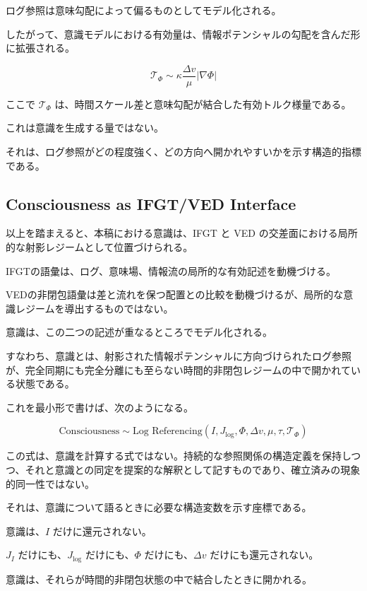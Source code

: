 ログ参照は意味勾配によって偏るものとしてモデル化される。

したがって、意識モデルにおける有効量は、情報ポテンシャルの勾配を含んだ形に拡張される。

\begin{equation}
\mathcal{T}_{\Phi}
\sim
\kappa
\frac{\Delta v}{\mu}
|\nabla \Phi|
\end{equation}

ここで $\mathcal{T}_{\Phi}$ は、時間スケール差と意味勾配が結合した有効トルク様量である。

これは意識を生成する量ではない。

それは、ログ参照がどの程度強く、どの方向へ開かれやすいかを示す構造的指標である。

\subsection{Consciousness as IFGT/VED Interface}

以上を踏まえると、本稿における意識は、IFGT と VED の交差面における局所的な射影レジームとして位置づけられる。

IFGTの語彙は、ログ、意味場、情報流の局所的な有効記述を動機づける。

VEDの非閉包語彙は差と流れを保つ配置との比較を動機づけるが、局所的な意識レジームを導出するものではない。

意識は、この二つの記述が重なるところでモデル化される。

すなわち、意識とは、射影された情報ポテンシャルに方向づけられたログ参照が、完全同期にも完全分離にも至らない時間的非閉包レジームの中で開かれている状態である。

これを最小形で書けば、次のようになる。

\begin{equation}
\text{Consciousness}
\sim
\text{Log Referencing}
\left(
I,
J_{\log},
\Phi,
\Delta v,
\mu,
\tau,
\mathcal{T}_{\Phi}
\right)
\end{equation}

この式は、意識を計算する式ではない。持続的な参照関係の構造定義を保持しつつ、それと意識との同定を提案的な解釈として記すものであり、確立済みの現象的同一性ではない。

それは、意識について語るときに必要な構造変数を示す座標である。

意識は、$I$ だけに還元されない。

$J_I$ だけにも、$J_{\log}$ だけにも、$\Phi$ だけにも、$\Delta v$ だけにも還元されない。

意識は、それらが時間的非閉包状態の中で結合したときに開かれる。

